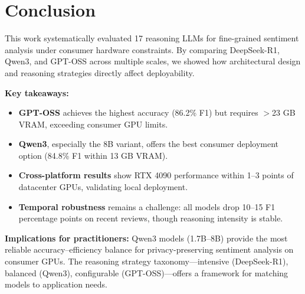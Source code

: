 \documentclass[conference]{IEEEtran}
\begin{document}
\section{Conclusion}
This work systematically evaluated 17 reasoning LLMs for fine-grained sentiment analysis under consumer hardware constraints. By comparing DeepSeek-R1, Qwen3, and GPT-OSS across multiple scales, we showed how architectural design and reasoning strategies directly affect deployability.  

\textbf{Key takeaways:}
\begin{itemize}
    \item \textbf{GPT-OSS} achieves the highest accuracy (86.2\% F1) but requires $>$23 GB VRAM, exceeding consumer GPU limits.  
    \item \textbf{Qwen3}, especially the 8B variant, offers the best consumer deployment option (84.8\% F1 within 13 GB VRAM).  
    \item \textbf{Cross-platform results} show RTX 4090 performance within 1--3 points of datacenter GPUs, validating local deployment.  
    \item \textbf{Temporal robustness} remains a challenge: all models drop 10--15 F1 percentage points on recent reviews, though reasoning intensity is stable.  
\end{itemize}

\textbf{Implications for practitioners:} Qwen3 models (1.7B--8B) provide the most reliable accuracy--efficiency balance for privacy-preserving sentiment analysis on consumer GPUs. The reasoning strategy taxonomy---intensive (DeepSeek-R1), balanced (Qwen3), configurable (GPT-OSS)---offers a framework for matching models to application needs.  
\end{document}

